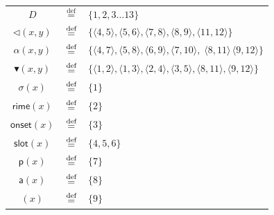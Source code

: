 \begin{figure}[ht]
\begin{minipage}[b]{0.2\textwidth}
\begin{tikzpicture}[
		node distance=1cm,
		every node/.style={circle, draw, inner sep=2pt},
		a/.style={->},    
		]
	\end{tikzpicture}
	\end{minipage} \hfill
	\begin{tabular}{ccl}
		\hline
  $D$& $\stackrel{\text{def}}{=}$ & $\{1, 2, 3 \ldots 13\}$\\                                                                                                   
  $\lhd(x,y)$        &          $\defeq$          & $\{\langle4,5\rangle,\langle5,6\rangle,\langle
7,8\rangle,\langle 8,9 \rangle, \langle 11,12 \rangle\}$                           \\
		      $\alpha(x,y)$       &          $\defeq$          & $\{\langle4,7\rangle,\langle5,8\rangle,\langle 6,9
\rangle,\langle 7,10\rangle,\; \langle 8,11 \rangle \,\langle 9,12 \rangle \}$ \\
		$\blacktriangledown(x,y)$ &          $\defeq$          & $\{\langle 1,2\rangle,\langle1,3\rangle,\langle 2,4 \rangle,\langle
3,5\rangle,
\langle 8,11 \rangle,\langle 9,12 \rangle \}$     \\ \hline
		  $\mathsf{\sigma}(x)$    &          $\defeq$          & $\{1\}$                                                                                                                           \\
		   $\mathsf{rime}(x)$     &          $\defeq$          & $\{2\}$                                                                                                                           \\
		   $\mathsf{onset}(x)$    &          $\defeq$          & $\{3\}$                                                                                                                           \\
		   $\mathsf{slot}(x)$     &          $\defeq$          & $ \{4,5,6\}$                                                                                                                      \\ \hline
		     $\mathsf{p}(x)$      &          $\defeq$          & $\{7\}$                                                                                                                           \\
		    ${\mathsf{a}}(x)$     &          $\defeq$          & $\{8\}$                                                                                                                           \\
		  {\textglotstop}$(x)$    &          $\defeq$          & $\{9\}$                                                                                                                           \\

\end{tabular}
\end{figure}
